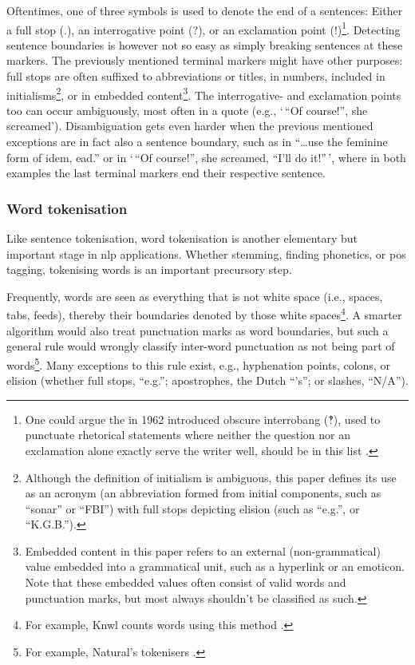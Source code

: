 Oftentimes, one of three symbols is used to denote the end of a
sentences: Either a full stop (.), an interrogative point (?), or an
exclamation point (!)\footnote{One could argue the in 1962 introduced
  obscure interrobang (‽), used to punctuate rhetorical statements where
  neither the question nor an exclamation alone exactly serve the writer
  well, should be in this list \autocite{interrobang-mks.com}.}.
Detecting sentence boundaries is however not so easy as simply breaking
sentences at these markers. The previously mentioned terminal markers
might have other purposes: full stops are often suffixed to
abbreviations or titles, in numbers, included in initialisms\footnote{Although
  the definition of initialism is ambiguous, this paper defines its use
  as an acronym (an abbreviation formed from initial components, such as
  ``sonar'' or ``FBI'') with full stops depicting elision (such as
  ``e.g.'', or ``K.G.B.'').}, or in embedded content\footnote{Embedded
  content in this paper refers to an external (non-grammatical) value
  embedded into a grammatical unit, such as a hyperlink or an emoticon.
  Note that these embedded values often consist of valid words and
  punctuation marks, but most always shouldn't be classified as such.}.
The interrogative- and exclamation points too can occur ambiguously,
most often in a quote (e.g., `\,``Of course!'', she screamed').
Disambiguation gets even harder when the previous mentioned exceptions
are in fact also a sentence boundary, such as in ``\ldots{}use the
feminine form of idem, ead.'' or in `\,``Of course!'', she screamed,
``I'll do it!''\,', where in both examples the last terminal markers end
their respective sentence.

\subsubsection{Word tokenisation}\label{word-tokenisation}

Like sentence tokenisation, word tokenisation is another elementary but
important stage in \gls{nlp} applications. Whether stemming, finding
phonetics, or \gls{pos} tagging, tokenising words is an important
precursory step.

Frequently, words are seen as everything that is not white space (i.e.,
spaces, tabs, feeds), thereby their boundaries denoted by those white
spaces\footnote{For example, Knwl counts words using this method
  \autocite{loadfive/knwl-source-code}.}. A smarter algorithm would also
treat punctuation marks as word boundaries, but such a general rule
would wrongly classify inter-word punctuation as not being part of
words\footnote{For example, Natural's tokenisers
  \autocite{NaturalNode/natural-source-code}.}. Many exceptions to this
rule exist, e.g., hyphenation points, colons, or elision (whether full
stops, ``e.g.''; apostrophes, the Dutch ``'s''; or slashes, ``N/A'').

